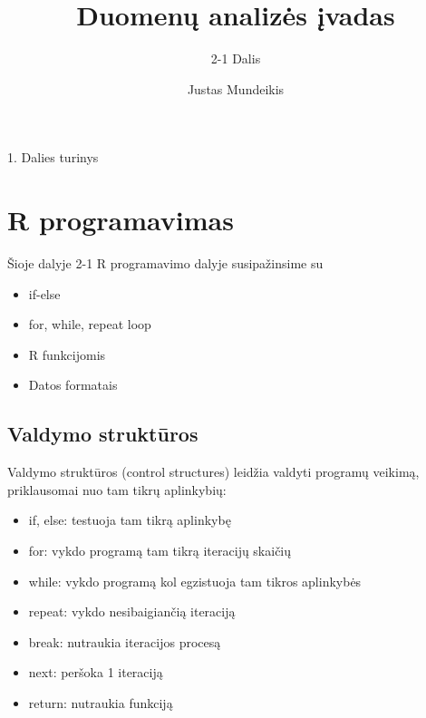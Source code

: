 \documentclass[11pt,xcolor=table]{beamer}
\author{Justas Mundeikis}
\title{Duomenų analizės įvadas}
\subtitle{2-1 Dalis}
\begin{document}

\begin{frame}
\titlepage
\end{frame}


\begin{frame}{1. Dalies turinys}
\tableofcontents
\end{frame}

\section{R programavimas}
\begin{frame}[fragile]{Šioje dalyje}
2-1 R programavimo dalyje susipažinsime su
\begin{itemize}
\item if-else 
\item for, while, repeat loop
\item R funkcijomis
\item Datos formatais
\end{itemize}
\end{frame}
\subsection{Valdymo struktūros}
\begin{frame}
Valdymo struktūros (control structures) leidžia valdyti programų veikimą, priklausomai nuo tam tikrų aplinkybių:
\begin{itemize}
\item if, else: testuoja tam tikrą aplinkybę
\item for: vykdo programą tam tikrą iteracijų skaičių
\item while: vykdo programą kol egzistuoja tam tikros aplinkybės
\item repeat: vykdo nesibaigiančią iteraciją
\item break: nutraukia iteracijos procesą
\item next: peršoka 1 iteraciją
\item return: nutraukia funkciją
\end{itemize}
\end{frame}
\end{document}
